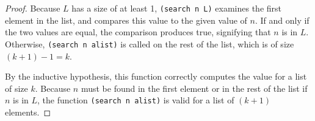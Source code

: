 \documentclass[11pt, notitlepage, leqno]{article}
\begin{document}
\begin{enumerate}
\begin{proof}
Because $L$ has a size of at least 1, \texttt{(search n L)} examines the first element in the list, and compares this value to the given value of $n$. If and only if the two values are equal, the comparison produces true, signifying that $n$ is in $L$. Otherwise, \texttt{(search n alist)} is called on the rest of the list, which is of size $(k+1) - 1 = k$.

By the inductive hypothesis, this function correctly computes the value for a list of size $k$. Because $n$ must be found in the first element or in the rest of the list if $n$ is in $L$, the function \texttt{(search n alist)} is valid for a list of $(k+1)$ elements.

\end{proof}

\end{enumerate}
\end{document}
